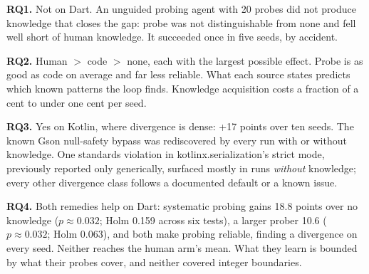 \textbf{RQ1.} Not on Dart. An unguided probing agent with 20 probes did not produce
knowledge that closes the gap: probe was not distinguishable from none and
fell well short of human knowledge. It succeeded once in five seeds, by
accident.

\textbf{RQ2.} Human $>$ code $>$ none, each with the largest possible effect.
Probe is as good as code on average and far less reliable. What each source
states predicts which known patterns the loop finds. Knowledge acquisition
costs a fraction of a cent to under one cent per seed.

\textbf{RQ3.} Yes on Kotlin, where divergence is dense: +17 points over ten
seeds. The known Gson null-safety bypass was rediscovered by every run with
or without knowledge. One standards violation in kotlinx.serialization's
strict mode, previously reported only generically, surfaced mostly in runs
\emph{without} knowledge; every other divergence class follows a documented
default or a known issue.

\textbf{RQ4.} Both remedies help on Dart: systematic probing gains 18.8
points over no knowledge ($p \approx 0.032$; Holm 0.159 across six tests),
a larger prober 10.6 ($p \approx 0.032$; Holm 0.063), and both make
probing reliable, finding a divergence on every seed. Neither reaches the
human arm's mean. What they learn is bounded by what their probes cover, and
neither covered integer boundaries.
